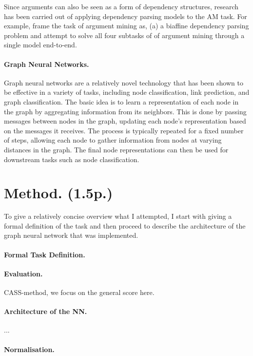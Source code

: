 \documentclass[11pt]{article}
\begin{document}
Since arguments can also be seen as a form of dependency structures, research has been carried out of applying dependency parsing models to the AM task. For example, \citet{ye_end--end_2021} frame the task of argument mining as, (a) a biaffine dependency parsing problem and attempt to solve all four subtasks of of argument mining through a single model end-to-end. 

\paragraph{Graph Neural Networks.} Graph neural networks are a relatively novel technology that has been shown to be effective in a variety of tasks, including node classification, link prediction, and graph classification. 
The basic idea is to learn a representation of each node in the graph by aggregating information from its neighbors. 
This is done by passing messages between nodes in the graph, updating each node's representation based on the messages it receives. 
The process is typically repeated for a fixed number of steps, allowing each node to gather information from nodes at varying distances in the graph. 
The final node representations can then be used for downstream tasks such as node classification.  

\section{Method. (1.5p.)}

To give a relatively concise overview what I attempted, I start with giving a formal definition of the task and then proceed to describe the architecture of the graph neural network that was implemented.

\paragraph{Formal Task Definition.} 

\paragraph{Evaluation.} CASS-method, we focus on the general score here.

\paragraph{Architecture of the NN.}...

\paragraph{Normalisation.}
\end{document}
